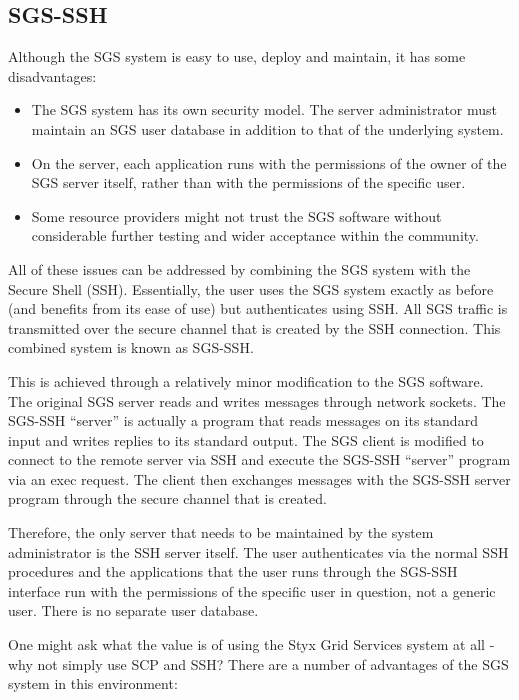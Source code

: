 \documentclass[a4paper]{article}
\begin{document}
\begin{multicols}{2}
\section{SGS-SSH}
Although the SGS system is easy to use, deploy and maintain, it has some disadvantages:

\begin{itemize}
\item The SGS system has its own security model.  The server administrator must maintain an SGS user database in addition to that of the underlying system.
\item On the server, each application runs with the permissions of the owner of the SGS server itself, rather than with the permissions of the specific user.
\item Some resource providers might not trust the SGS software without considerable further testing and wider acceptance within the community.
\end{itemize}

All of these issues can be addressed by combining the SGS system with the Secure Shell (SSH).  Essentially, the user uses the SGS system exactly as before (and benefits from its ease of use) but authenticates using SSH.  All SGS traffic is transmitted over the secure channel that is created by the SSH connection.  This combined system is known as SGS-SSH.

This is achieved through a relatively minor modification to the SGS software.  The original SGS server reads and writes messages through network sockets.  The SGS-SSH ``server'' is actually a program that reads messages on its standard input and writes replies to its standard output.  The SGS client is modified to connect to the remote server via SSH and execute the SGS-SSH ``server'' program via an exec request.  The client then exchanges messages with the SGS-SSH server program through the secure channel that is created.

Therefore, the only server that needs to be maintained by the system administrator is the SSH server itself.  The user authenticates via the normal SSH procedures and the applications that the user runs through the SGS-SSH interface run with the permissions of the specific user in question, not a generic user.  There is no separate user database.

One might ask what the value is of using the Styx Grid Services system at all - why not simply use SCP and SSH?  There are a number of advantages of the SGS system in this environment:


\end{multicols}
\end{document}
